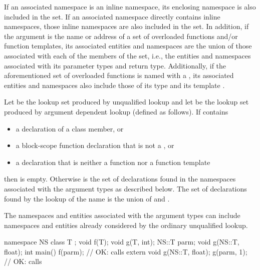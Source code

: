 If an associated namespace is an inline namespace, its
enclosing namespace is also included in the set. If an associated namespace
directly contains inline namespaces, those inline namespaces are also included
in the set.
In addition, if the argument is the name or address of a set of
overloaded functions and/or function templates, its associated entities
and namespaces are the union of those associated with each of the
members of the set, i.e., the entities and namespaces associated with its
parameter types and return type.
Additionally, if the aforementioned set of overloaded functions is named with
a , its associated entities and namespaces also include
those of its type  and its template
.

\pnum
Let  be the lookup set produced by unqualified
lookup and let  be the lookup set produced
by argument dependent lookup (defined as follows). If  contains
\begin{itemize}
\item a declaration of a class member, or
\item a block-scope function declaration that is not a , or
\item a declaration that is neither a function nor a function template
\end{itemize}
then  is empty. Otherwise  is the set of declarations
found in the namespaces associated with the argument types as described
below. The set of declarations found by the lookup of the name is the
union of  and .
\begin{note}
The namespaces and entities
associated with the argument types can include namespaces and entities
already considered by the ordinary unqualified lookup.
\end{note}
\begin{example}
\begin{codeblock}
namespace NS {
  class T { };
  void f(T);
  void g(T, int);
}
NS::T parm;
void g(NS::T, float);
int main() {
  f(parm);                      // OK: calls 
  extern void g(NS::T, float);
  g(parm, 1);                   // OK: calls 
}
\end{codeblock}
\end{example}

